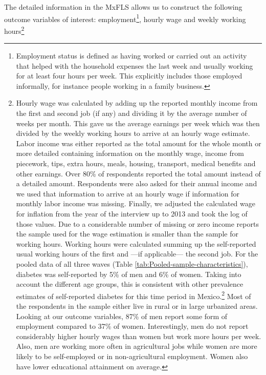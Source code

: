 \documentclass[12pt,english]{article}
\begin{document}
The detailed information in the \ac{MxFLS} allows us to construct the following outcome variables of interest: employment\footnote{Employment status is defined as having worked or carried out an activity that helped with the household expenses the last week and usually working for at least four hours per week. This explicitly includes those employed informally, for instance people working in a family business.}, hourly wage and weekly working hours\footnote{Hourly wage was calculated by adding up the reported monthly income from the first and second job (if any) and dividing it by the average number of weeks per month. This gave us the average earnings per week which was then divided by the weekly working hours to arrive at an hourly wage estimate. Labor income was either reported as the total amount for the whole month or more detailed containing information on the monthly wage, income from piecework, tips, extra hours, meals, housing, transport, medical benefits and other earnings. Over 80\% of respondents reported the total amount instead of a detailed amount. Respondents were also asked for their annual income and we used that information to arrive at an hourly wage if information for monthly labor income was missing. Finally, we adjusted the calculated wage for inflation from the year of the interview up to 2013 and took the log of those values. Due to a considerable number of missing or zero income reports the sample used for the wage estimation is smaller than the sample for working hours. Working hours were calculated summing up the self-reported usual working hours of the first and ---if applicable--- the second job. For the pooled data of all three waves (Table  \ref{tab:Pooled-sample-characteristics}), diabetes was self-reported by 5\% of men and 6\% of women. Taking into account the different age groups, this is consistent with other prevalence estimates of self-reported diabetes for this time period in Mexico.\footnote{\textcite{Barquera2013} show that the prevalence of diagnosed diabetes in Mexico was 7.5\% in 2006, only somewhat above our results, which may be the result of the slightly different age groups considered.}  Most of the respondents in the sample either live in rural or in large urbanized areas. Looking at our outcome variables, 87\% of men report some form of employment compared to 37\% of women. Interestingly, men do not report considerably higher hourly wages than women but work more hours per week. Also, men are working more often in agricultural jobs while women are more likely to be self-employed or in non-agricultural employment. Women also have lower educational attainment on average. 

}
\end{document}

